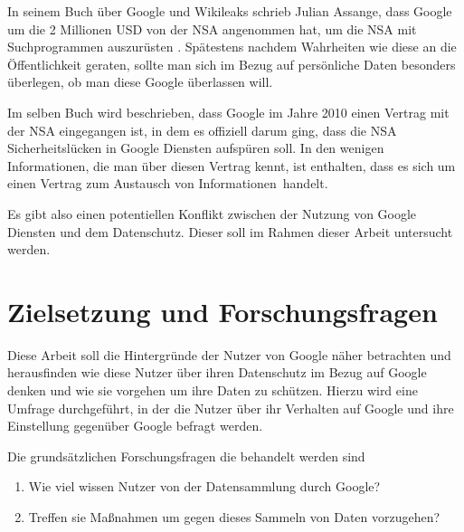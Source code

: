 In seinem Buch über Google und Wikileaks schrieb Julian Assange, dass Google um die 2 Millionen USD von der NSA angenommen hat, um die NSA mit Suchprogrammen auszurüsten \citet{assangebook}. Spätestens nachdem Wahrheiten wie diese an die Öffentlichkeit geraten, sollte man sich im Bezug auf persönliche Daten besonders überlegen, ob man diese Google überlassen will.

Im selben Buch wird beschrieben, dass Google im Jahre 2010 einen Vertrag mit der NSA eingegangen ist, in dem es offiziell darum ging, dass die NSA Sicherheitslücken in Google Diensten aufspüren soll. In den wenigen Informationen, die man über diesen Vertrag kennt, ist enthalten, dass es sich um einen Vertrag zum \glqq Austausch von Informationen\grqq\ handelt.

Es gibt also einen potentiellen Konflikt zwischen der Nutzung von Google Diensten und dem Datenschutz. Dieser soll im Rahmen dieser Arbeit untersucht werden.

\section{Zielsetzung und Forschungsfragen}
Diese Arbeit soll die Hintergründe der Nutzer von Google näher betrachten und herausfinden wie diese Nutzer über ihren Datenschutz im Bezug auf Google denken und wie sie vorgehen um ihre Daten zu schützen. Hierzu wird eine Umfrage durchgeführt, in der die Nutzer über ihr Verhalten auf Google und ihre Einstellung gegenüber Google befragt werden.

Die grundsätzlichen Forschungsfragen die behandelt werden sind
\begin{enumerate}
\item Wie viel wissen Nutzer von der Datensammlung durch Google?
\item Treffen sie Maßnahmen um gegen dieses Sammeln von Daten vorzugehen?
\end{enumerate}